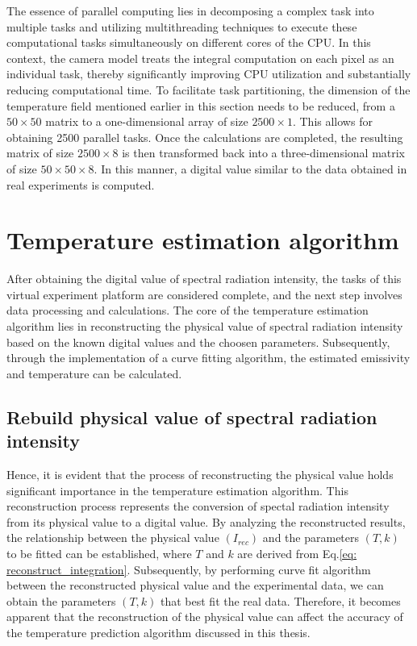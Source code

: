 The essence of parallel computing lies in decomposing a complex task into 
multiple tasks and utilizing multithreading techniques to execute these 
computational tasks simultaneously on different cores of the CPU. In 
this context, the camera model treats the integral computation on each pixel as an 
individual task, thereby significantly improving CPU utilization and substantially 
reducing computational time\cite{Asanovic.2009}. To facilitate task partitioning, the 
dimension of the temperature field 
mentioned earlier in this section needs to be reduced, from 
a $50\times 50$ matrix to a one-dimensional array of size $2500\times1$. This allows for 
obtaining 2500 parallel tasks. Once the calculations are completed, the 
resulting matrix of size $2500\times8$ is then transformed back into a three-dimensional 
matrix of size $50\times50\times8$. In this manner, a digital value similar to the data 
obtained in real experiments is computed.


\section{Temperature estimation algorithm}
After obtaining the digital value of spectral radiation intensity, 
the tasks of this virtual experiment platform are considered complete, 
and the next step involves data processing and calculations. The core 
of the temperature estimation algorithm lies in reconstructing the physical 
value of spectral radiation intensity based on the known digital values and 
the choosen parameters. 
Subsequently, through the implementation of a curve fitting algorithm, the 
estimated emissivity and temperature can be calculated.


\subsection{Rebuild physical value of spectral radiation intensity}
Hence, it is evident that the process of reconstructing the physical value holds 
significant importance in the temperature estimation algorithm. This reconstruction 
process represents the conversion of spectal radiation intensity from its physical value to a 
digital value. By analyzing the reconstructed results, the 
relationship between the physical value $(I_{rec})$ and the parameters $(T, k)$ to be fitted can be established, 
where $T$ and $k$ are derived from Eq.\ref{eq: reconstruct_integration}. Subsequently, 
by performing curve 
fit algorithm between the reconstructed physical value and the experimental data, we 
can obtain the parameters $(T, k)$ that best fit the real data. Therefore, it 
becomes apparent that the reconstruction of the physical value can affect 
the accuracy of the temperature prediction algorithm discussed in this thesis.


